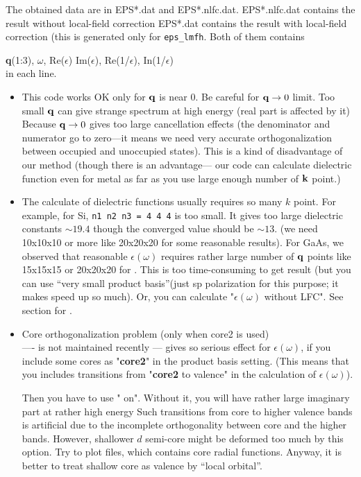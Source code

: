 The obtained data are in {\sf EPS*.dat} and {\sf EPS*.nlfc.dat}.
{\sf EPS*.nlfc.dat} contains the result without local-field correction
{\sf EPS*.dat} contains the result with local-field correction
(this is generated only for \verb#eps_lmfh#. Both of them contains

{\bf q}(1:3), $\omega$, Re($\epsilon$) Im($\epsilon$), Re(1/$\epsilon$), In(1/$\epsilon$)\\
in each line.

\begin{itemize}
 \item 
This code works OK only for ${\bf q}$ is near 0.
Be careful for ${\bf q} \to 0$ limit. Too small ${\bf q}$ can give strange
spectrum at high energy (real part is affected by it)\\

Because ${\bf q} \to 0$ gives too large cancellation effects
(the denominator and numerator go to zero---it means we need very accurate
orthogonalization between occupied and unoccupied states).
This is a kind of disadvantage of our method (though there is an advantage---
our code can calculate dielectric function even for metal 
as far as you use large enough number of ${\bf k}$ point.)

\item
The calculate of dielectric functions usually requires so many $k$ point. 
For example, for Si,  \verb#n1 n2 n3 = 4 4 4# is too small. 
It gives too large dielectric constants $\sim19.4$ though
the converged value should be $\sim13$. (we need 10x10x10 or more like 20x20x20
for some reasonable results).
For GaAs, we observed that reasonable $\epsilon(\omega)$ requires
rather large number of ${\bf q}$ points like 15x15x15 or 20x20x20
for . This is too time-consuming to get result
(but you can use ``very small product basis''(just sp polarization for this purpose;
it makes speed up so much). Or, you can calculate "$\epsilon(\omega)$ without LFC". 
See section for .

\item Core orthogonalization problem (only when core2 is used)\\
---- is not maintained recently ---
  gives so serious effect for 
$\epsilon(\omega)$, if you include some cores as "{\bf core2}"
in the product basis setting.
(This means that you includes transitions from "{\bf core2} to
valence" in the calculation of $\epsilon(\omega)$).

Then you have to use " on". Without it,
you will have rather large imaginary part at rather high energy
Such transitions from core to higher valence bands
is artificial due to the incomplete orthogonality
between core and the higher bands.
However, shallower $d$ semi-core might be deformed too much
by this option. Try to plot  files, 
which contains core radial functions. 
Anyway, it is better to treat shallow core as valence by ``local orbital''.
\end{itemize}




